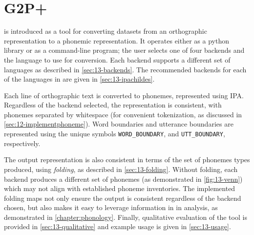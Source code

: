 
\section{G2P+}

\gpp is introduced as a tool for converting datasets from an orthographic representation to a phonemic representation. It operates either as a python library or as a command-line program; the user selects one of four backends and the language to use for conversion. Each backend supports a different set of languages as described in \cref{sec:13-backends}. The recommended backends for each of the languages in \ipachildes are given in \cref{sec:13-ipachildes}.

Each line of orthographic text is converted to phonemes, represented using IPA. Regardless of the backend selected, the representation is consistent, with phonemes separated by whitespace (for convenient tokenization, as discussed in \cref{sec:12-implementphoneme}). Word boundaries and utterance boundaries are represented using the unique symbols \texttt{WORD\_BOUNDARY}, and \texttt{UTT\_BOUNDARY}, respectively. 

The output representation is also consistent in terms of the set of phonemes types produced, using \emph{folding}, as described in \cref{sec:13-folding}. Without folding, each backend produces a different set of phonemes (as demonstrated in \cref{fig:13-venn}) which may not align with established phoneme inventories. The implemented folding maps not only ensure the output is consistent regardless of the backend chosen, but also makes it easy to leverage information in \phoible in analysis, as demonstrated in \cref{chapter:phonology}. Finally, qualitative evaluation of the tool is provided in \cref{sec:13-qualitative} and example usage is given in \cref{sec:13-usage}.



